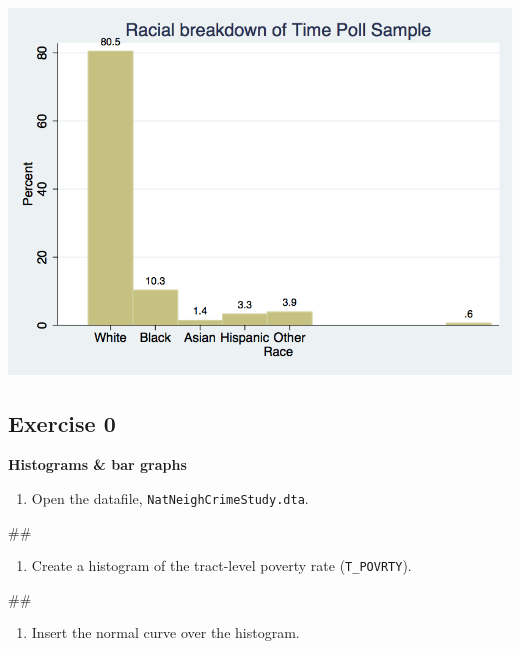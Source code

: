 \documentclass[
]{book}
\newenvironment{Shaded}{\begin{snugshade}}{\end{snugshade}}
\newcommand{\NormalTok}[1]{#1}
\providecommand{\tightlist}{%
  \setlength{\itemsep}{0pt}\setlength{\parskip}{0pt}}
\begin{document}
\includegraphics{Stata/StataGraph/images/bargraph.png}

\hypertarget{exercise-0-8}{%
\subsection{Exercise 0}\label{exercise-0-8}}

\textbf{Histograms \& bar graphs}

\begin{enumerate}
\def\labelenumi{\arabic{enumi}.}
\tightlist
\item
  Open the datafile, \texttt{NatNeighCrimeStudy.dta}.
\end{enumerate}

\begin{Shaded}
\begin{Highlighting}[]
\NormalTok{\#\#}
\end{Highlighting}
\end{Shaded}

\begin{enumerate}
\def\labelenumi{\arabic{enumi}.}
\setcounter{enumi}{1}
\tightlist
\item
  Create a histogram of the tract-level poverty rate (\texttt{T\_POVRTY}).
\end{enumerate}

\begin{Shaded}
\begin{Highlighting}[]
\NormalTok{\#\#}
\end{Highlighting}
\end{Shaded}

\begin{enumerate}
\def\labelenumi{\arabic{enumi}.}
\setcounter{enumi}{2}
\tightlist
\item
  Insert the normal curve over the histogram.
\end{enumerate}
\end{document}
